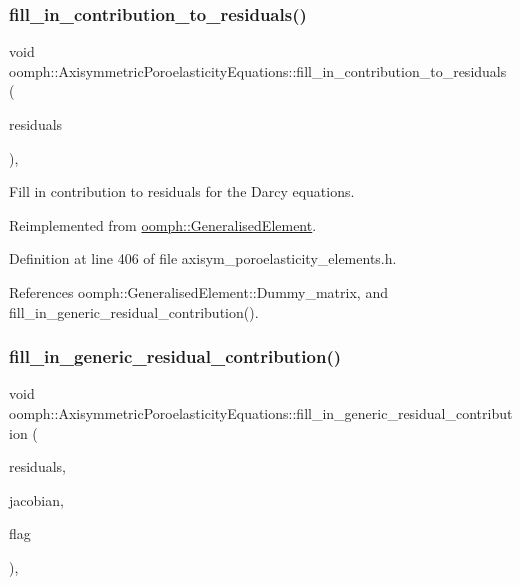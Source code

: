 \subsubsection{\texorpdfstring{fill\+\_\+in\+\_\+contribution\+\_\+to\+\_\+residuals()}{fill\_in\_contribution\_to\_residuals()}}
{\footnotesize\ttfamily void oomph\+::\+Axisymmetric\+Poroelasticity\+Equations\+::fill\+\_\+in\+\_\+contribution\+\_\+to\+\_\+residuals (\begin{DoxyParamCaption}\item[{\hyperlink{classoomph_1_1Vector}{Vector}$<$ double $>$ \&}]{residuals }\end{DoxyParamCaption})\hspace{0.3cm}{\ttfamily [inline]}, {\ttfamily [virtual]}}



Fill in contribution to residuals for the Darcy equations. 



Reimplemented from \hyperlink{classoomph_1_1GeneralisedElement_a310c97f515e8504a48179c0e72c550d7}{oomph\+::\+Generalised\+Element}.



Definition at line 406 of file axisym\+\_\+poroelasticity\+\_\+elements.\+h.



References oomph\+::\+Generalised\+Element\+::\+Dummy\+\_\+matrix, and fill\+\_\+in\+\_\+generic\+\_\+residual\+\_\+contribution().

\mbox{\label{classoomph_1_1AxisymmetricPoroelasticityEquations_ab71a0b881d269e7dd0550003c50f6c3f}} 
\subsubsection{\texorpdfstring{fill\+\_\+in\+\_\+generic\+\_\+residual\+\_\+contribution()}{fill\_in\_generic\_residual\_contribution()}}
{\footnotesize\ttfamily void oomph\+::\+Axisymmetric\+Poroelasticity\+Equations\+::fill\+\_\+in\+\_\+generic\+\_\+residual\+\_\+contribution (\begin{DoxyParamCaption}\item[{\hyperlink{classoomph_1_1Vector}{Vector}$<$ double $>$ \&}]{residuals,  }\item[{\hyperlink{classoomph_1_1DenseMatrix}{Dense\+Matrix}$<$ double $>$ \&}]{jacobian,  }\item[{bool}]{flag }\end{DoxyParamCaption})\hspace{0.3cm}{\ttfamily [protected]}, {\ttfamily [virtual]}}



